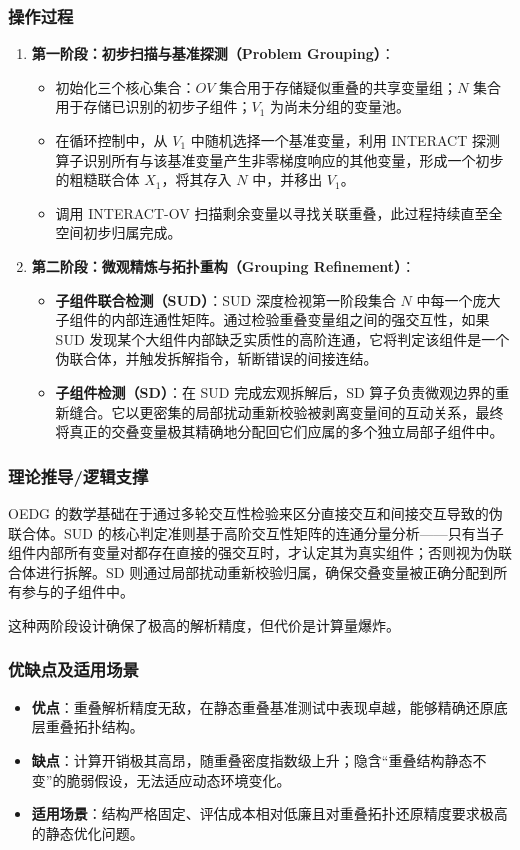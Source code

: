 \subsubsection*{操作过程}
\begin{enumerate}
    \item \textbf{第一阶段：初步扫描与基准探测（Problem Grouping）}：
    \begin{itemize}
        \item 初始化三个核心集合：$OV$ 集合用于存储疑似重叠的共享变量组；$N$ 集合用于存储已识别的初步子组件；$V_1$ 为尚未分组的变量池。
        \item 在循环控制中，从 $V_1$ 中随机选择一个基准变量，利用 INTERACT 探测算子识别所有与该基准变量产生非零梯度响应的其他变量，形成一个初步的粗糙联合体 $X_1$，将其存入 $N$ 中，并移出 $V_1$。
        \item 调用 INTERACT-OV 扫描剩余变量以寻找关联重叠，此过程持续直至全空间初步归属完成。
    \end{itemize}
    \item \textbf{第二阶段：微观精炼与拓扑重构（Grouping Refinement）}：
    \begin{itemize}
        \item \textbf{子组件联合检测（SUD）}：SUD 深度检视第一阶段集合 $N$ 中每一个庞大子组件的内部连通性矩阵。通过检验重叠变量组之间的强交互性，如果 SUD 发现某个大组件内部缺乏实质性的高阶连通，它将判定该组件是一个伪联合体，并触发拆解指令，斩断错误的间接连结。
        \item \textbf{子组件检测（SD）}：在 SUD 完成宏观拆解后，SD 算子负责微观边界的重新缝合。它以更密集的局部扰动重新校验被剥离变量间的互动关系，最终将真正的交叠变量极其精确地分配回它们应属的多个独立局部子组件中。
    \end{itemize}
\end{enumerate}

\subsubsection*{理论推导/逻辑支撑}
OEDG 的数学基础在于通过多轮交互性检验来区分直接交互和间接交互导致的伪联合体。SUD 的核心判定准则基于高阶交互性矩阵的连通分量分析——只有当子组件内部所有变量对都存在直接的强交互时，才认定其为真实组件；否则视为伪联合体进行拆解。SD 则通过局部扰动重新校验归属，确保交叠变量被正确分配到所有参与的子组件中。

这种两阶段设计确保了极高的解析精度，但代价是计算量爆炸。

\subsubsection*{优缺点及适用场景}
\begin{itemize}
    \item \textbf{优点}：重叠解析精度无敌，在静态重叠基准测试中表现卓越，能够精确还原底层重叠拓扑结构。
    \item \textbf{缺点}：计算开销极其高昂，随重叠密度指数级上升；隐含“重叠结构静态不变”的脆弱假设，无法适应动态环境变化。
    \item \textbf{适用场景}：结构严格固定、评估成本相对低廉且对重叠拓扑还原精度要求极高的静态优化问题。
\end{itemize}

